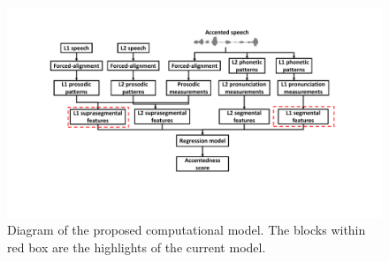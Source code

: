 \begin{figure}[t]
        \begin{minipage}[t]{1.0\linewidth}
        \centering
            \includegraphics[width=5.0in]{figures/AAE_diagram.pdf}
        \end{minipage}%
        \caption{Diagram of the proposed computational model. The blocks within red box are the highlights of the current model.}
        \centering
        \label{fig:aae_diagram}
     \end{figure}

